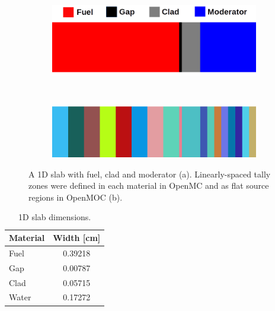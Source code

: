 \begin{figure}[h!]
\begin{subfigure}{\textwidth}
  \centering
  \includegraphics[width=0.7\linewidth]{figures/biases/slab/slab-simple-labels}
  \caption{}
\end{subfigure} \\
\begin{subfigure}{\textwidth}
  \centering
  \includegraphics[width=0.7\linewidth]{figures/biases/slab/slab-8x}
  \caption{}
\end{subfigure}
\caption[1D slab materials and geometry]{A 1D slab with fuel, clad and moderator (a). Linearly-spaced tally zones were defined in each material in OpenMC and as flat source regions in OpenMOC (b).}
\label{fig:chap4-slab}
\end{figure}

\begin{table}[h!]
  \centering
  \caption{1D slab dimensions.}
  \label{table:chap2-slab-widths} 
  \vspace{14pt}
  \begin{tabular}{l c}
  \toprule
  \multicolumn{1}{c}{\bf Material} &
  \multicolumn{1}{c}{\bf Width [cm]} \\
  \midrule
  Fuel &  0.39218 \\
  Gap &   0.00787 \\
  Clad &  0.05715 \\
  Water & 0.17272 \\
  \bottomrule
\end{tabular}
\end{table}

